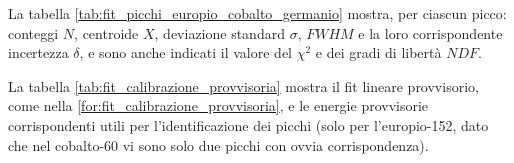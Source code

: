 \documentclass{article}
\begin{document}
            \newpage
            La tabella \ref{tab:fit_picchi_europio_cobalto_germanio} mostra, per ciascun picco: conteggi $N$, centroide $X$, deviazione standard $\sigma$, $FWHM$ e la loro corrispondente incertezza $\delta$, e sono anche indicati il valore del $\chi^2$ e dei gradi di libertà $NDF$.

            \begin{table}[h!]
                \centering
                \caption{risultati fit picchi}
                \label{tab:fit_picchi_europio_cobalto_germanio}
                
            \end{table}
            
            \newpage
            La tabella \ref{tab:fit_calibrazione_provvisoria} mostra il fit lineare provvisorio, come nella \eqref{for:fit_calibrazione_provvisoria}, e le energie provvisorie corrispondenti utili per l'identificazione dei picchi (solo per l'europio-152, dato che nel cobalto-60 vi sono solo due picchi con ovvia corrispondenza).
            
\end{document}
